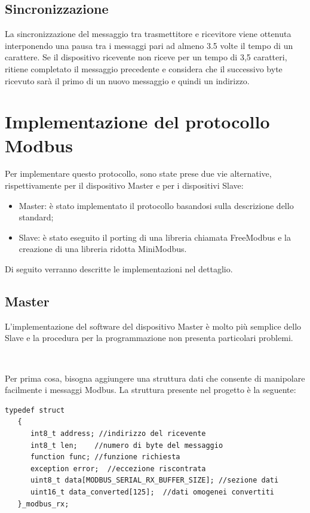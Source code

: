 \documentclass[a4paper,titlepage]{book}
\newcommand{\itema}{\begin{itemize}[noitemsep,topsep=10pt,parsep=5pt,partopsep=10pt]}
\begin{document}
\subsection{Sincronizzazione}
La sincronizzazione del messaggio tra trasmettitore e ricevitore viene ottenuta interponendo una pausa tra i messaggi pari ad almeno 3.5 volte il tempo di un carattere. Se il dispositivo ricevente non riceve per un tempo di 3,5 caratteri, ritiene completato il messaggio precedente e considera che il successivo byte ricevuto sarà il primo di un nuovo messaggio e quindi un indirizzo.


\section{Implementazione del protocollo Modbus}

Per implementare questo protocollo, sono state prese due vie alternative, rispettivamente per il dispositivo Master e per i dispositivi Slave:


\itema

\item Master: è stato implementato il protocollo basandosi sulla descrizione dello standard;
\item Slave: è stato eseguito il porting di una libreria chiamata FreeModbus e la creazione di una libreria ridotta MiniModbus.

\end{itemize}

Di seguito verranno descritte le implementazioni nel dettaglio.

\subsection{Master}

L'implementazione del software del dispositivo Master è molto più semplice dello Slave e la procedura per la programmazione non presenta particolari problemi.

~

Per prima cosa, bisogna aggiungere una struttura dati che consente di manipolare facilmente i messaggi Modbus. La struttura presente nel progetto è la seguente:

\begin{lstlisting}[showlines=false]
typedef struct
   {
      int8_t address; //indirizzo del ricevente
      int8_t len;    //numero di byte del messaggio
      function func; //funzione richiesta
      exception error;  //eccezione riscontrata
      uint8_t data[MODBUS_SERIAL_RX_BUFFER_SIZE]; //sezione dati
      uint16_t data_converted[125];  //dati omogenei convertiti
   }_modbus_rx;
\end{lstlisting}
\end{document}
